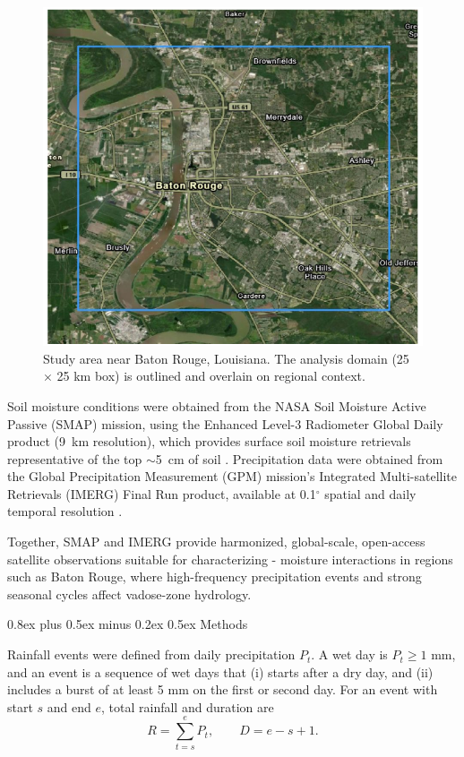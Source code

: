 \documentclass[9pt, twocolumn]{extarticle}
\makeatletter
\renewcommand\section{\@startsection{section}{1}{0pt}%
  {0.8ex plus 0.5ex minus 0.2ex}%
  {0.5ex}%
  {\normalfont\Large\bfseries}}
\makeatother
\begin{document}
\begin{figure}[!h] %
  \centering
  \includegraphics[width=0.75\columnwidth]{map}
  \caption{Study area near Baton Rouge, Louisiana. The analysis domain (25 $\times$ 25 km box) is outlined and overlain on regional context.}
  \label{fig:map}
\end{figure}

Soil moisture conditions were obtained from the NASA Soil Moisture Active Passive (SMAP) mission, using the Enhanced Level-3 Radiometer Global Daily product (9~km resolution), which provides surface soil moisture retrievals representative of the top $\sim$5~cm of soil \cite{smap}. Precipitation data were obtained from the Global Precipitation Measurement (GPM) mission's Integrated Multi-satellite Retrievals (IMERG) Final Run product, available at 0.1$^{\circ}$ spatial and daily temporal resolution \cite{imergdp}.

Together, SMAP and IMERG provide harmonized, global-scale, open-access satellite observations suitable for characterizing - moisture interactions in regions such as Baton Rouge, where high-frequency precipitation events and strong seasonal cycles affect vadose-zone hydrology.

\section{Methods}

Rainfall events were defined from daily precipitation \(P_t\). A wet day is \(P_t \geq 1\) mm, and an event is a sequence of wet days that (i) starts after a dry day, and (ii) includes a burst of at least 5 mm on the first or second day. For an event with start \(s\) and end \(e\), total rainfall and duration are  
\[
R = \sum_{t=s}^{e} P_t, 
\qquad 
D = e - s + 1.
\]
\end{document}
